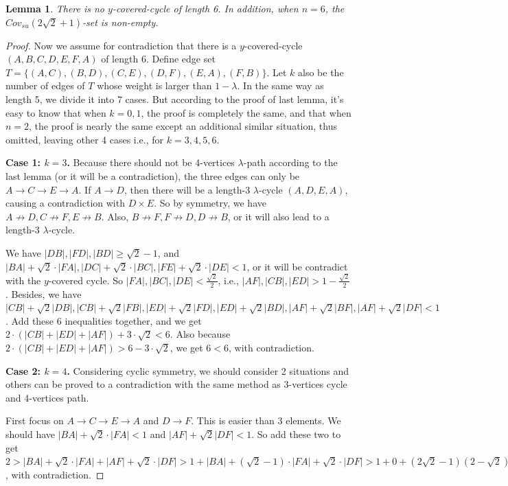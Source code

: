\documentclass[11pt]{article}
\newtheorem{lemma}[theorem]{Lemma}
\theoremstyle{remark}
\begin{document}
\begin{lemma}\label{lem:n6}
There is no $y$-covered-cycle of length 6.  In addition, when $n=6$, the $Cov_{su}(2\sqrt2+1)$-set is non-empty.
\end{lemma}

\begin{proof}
 Now we assume for contradiction that there is a $y$-covered-cycle $(A,B,C,D,E,F,A)$ of length 6. Define edge set $T=\{(A,C),(B,D),(C,E),(D,F),(E,A),(F,B)\}$. Let $k$ also be the number of edges of $T$ whose weight is larger than $1-\lambda$. In the same way as length 5, we divide it into 7 cases. But according to the proof of last lemma, it's easy to know that when $k=0,1$, the proof is completely the same, and that when $n=2$, the proof is nearly the same except an additional similar situation, thus omitted, leaving other 4 cases i.e., for $k=3,4,5,6$.

\noindent\textbf{Case 1: $k=3$.} Because there should not be 4-vertices $\lambda$-path according to the last lemma (or it will be a contradiction), the three edges can only be $A\rightarrow C\rightarrow E\rightarrow A$. If $A\rightarrow D$, then there will be a length-3 $\lambda$-cycle $(A,D,E,A)$, causing a contradiction with $D\times E$. So by symmetry, we have $A\nrightarrow D,C\nrightarrow F,E\nrightarrow B$. Also, $B\nrightarrow F,F\nrightarrow D,D\nrightarrow B$, or it will also lead to a length-3 $\lambda$-cycle.

We have $|DB|,|FD|,|BD|\ge \sqrt2-1$, and $|BA|+\sqrt2\cdot |FA|, |DC|+\sqrt2\cdot |BC|, |FE|+\sqrt2\cdot |DE|<1$, or it will be contradict with the $y$-covered cycle. So $|FA|,|BC|,|DE|<\frac{\sqrt2}{2}$, i.e., $|AF|,|CB|,|ED|>1-\frac{\sqrt2}{2}$. Besides, we have $|CB|+\sqrt2|DB|,|CB|+\sqrt2|FB|,|ED|+\sqrt2|FD|,|ED|+\sqrt2|BD|,|AF|+\sqrt2|BF|,|AF|+\sqrt2|DF|<1$. Add these 6 inequalities together, and we get $2\cdot (|CB|+|ED|+|AF|)+3\cdot \sqrt2 < 6$. Also because $2\cdot(|CB|+|ED|+|AF|)>6-3\cdot \sqrt2$, we get $6<6$, with contradiction.

\noindent\textbf{Case 2: $k=4$.}
Considering cyclic symmetry, we should consider 2 situations and others can be proved to a contradiction with the same method as 3-vertices cycle and 4-vertices path.

First focus on $A\rightarrow C\rightarrow E\rightarrow A$ and $D\rightarrow F$.
This is easier than 3 elements. We should have $|BA|+\sqrt2\cdot |FA|<1$ and $|AF|+\sqrt2|DF|<1$. So add these two to get $2>|BA|+\sqrt2\cdot|FA|+|AF|+\sqrt2\cdot|DF|>1+|BA|+(\sqrt2-1)\cdot|FA|+\sqrt2\cdot |DF|
> 1 + 0 + (2\sqrt2-1)(2-\sqrt2)=5\sqrt2-5>2$, with contradiction.


\end{proof}
\end{document}
